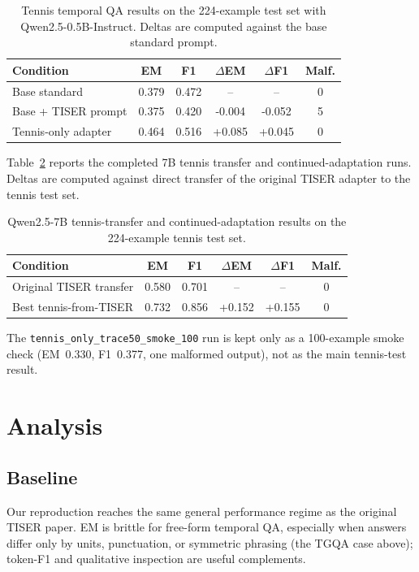 \documentclass[conference]{IEEEtran}
\begin{document}
\begin{table}[t]
\centering
\caption{Tennis temporal QA results on the 224-example test set with Qwen2.5-0.5B-Instruct. Deltas are computed against the base standard prompt.}
\label{tab:tennis-final}
\setlength{\tabcolsep}{3pt}
{\footnotesize
\begin{tabular}{lccccc}
\toprule
Condition & EM & F1 & $\Delta$EM & $\Delta$F1 & Malf. \\
\midrule
Base standard & 0.379 & 0.472 & -- & -- & 0 \\
Base + TISER prompt & 0.375 & 0.420 & -0.004 & -0.052 & 5 \\
Tennis-only adapter & 0.464 & 0.516 & +0.085 & +0.045 & 0 \\
\bottomrule
\end{tabular}
}
\end{table}

Table~\ref{tab:tennis-7b} reports the completed 7B tennis transfer and continued-adaptation runs. Deltas are computed against direct transfer of the original TISER adapter to the tennis test set.

\begin{table}[t]
\centering
\caption{Qwen2.5-7B tennis-transfer and continued-adaptation results on the 224-example tennis test set.}
\label{tab:tennis-7b}
\setlength{\tabcolsep}{3pt}
{\footnotesize
\begin{tabular}{lccccc}
\toprule
Condition & EM & F1 & $\Delta$EM & $\Delta$F1 & Malf. \\
\midrule
Original TISER transfer & 0.580 & 0.701 & -- & -- & 0 \\
Best tennis-from-TISER & 0.732 & 0.856 & +0.152 & +0.155 & 0 \\
\bottomrule
\end{tabular}
}
\end{table}

The \texttt{tennis\_only\_trace50\_smoke\_100} run is kept only as a 100-example smoke check (EM~0.330, F1~0.377, one malformed output), not as the main tennis-test result.

\section{Analysis}

\subsection{Baseline}

Our reproduction reaches the same general performance regime as the original TISER paper. EM is brittle for free-form temporal QA, especially when answers differ only by units, punctuation, or symmetric phrasing (the TGQA case above); token-F1 and qualitative inspection are useful complements.
\end{document}
